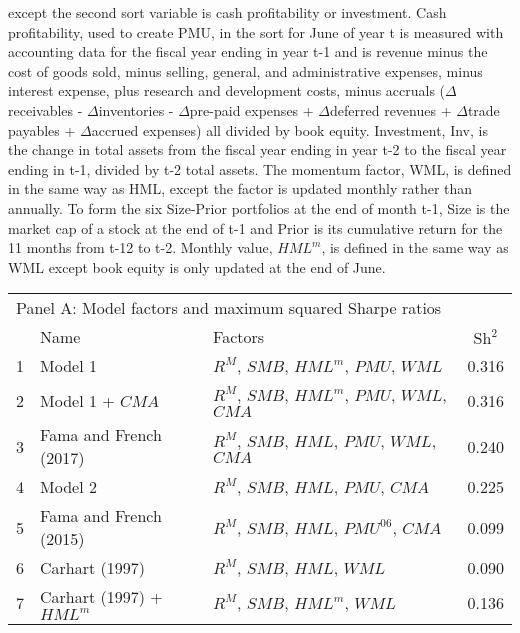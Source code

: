 \begin{table}[!ht]
{{except the second sort variable is cash profitability or investment.
Cash profitability, used to create PMU, in the sort for June of year t is
measured with accounting data for the fiscal year ending in year t-1 and is
revenue minus the cost of goods sold, minus selling, general, and
administrative expenses, minus interest expense, plus research and development
costs, minus accruals
($\Delta$receivables - $\Delta$inventories - $\Delta$pre-paid expenses +
$\Delta$deferred revenues + $\Delta$trade payables + $\Delta$accrued expenses)
all divided by book equity.
Investment, Inv, is the change in total assets from the fiscal year ending in
year t-2 to the fiscal year ending in t-1, divided by t-2 total assets.
The momentum factor, WML, is defined in the same way as HML, except the factor
is updated monthly rather than annually.
To form the six Size-Prior portfolios at the end of month t-1,
Size is the market cap of a stock at the end of t-1 and Prior is its
cumulative return for the 11 months from t-12 to t-2.
Monthly value, $HML^m$, is defined in the same way as WML except book
equity is only updated at the end of June.
}
}
\begin{tabular}{lcccccc}
  \toprule
  \multicolumn{7}{l}{Panel A: Model factors and maximum squared Sharpe ratios} \\
        & \multicolumn{2}{l}{Name}                         & \multicolumn{3}{l}{Factors}                                   & $\text{Sh}^2$   \\
  1     & \multicolumn{2}{l}{Model 1}                      & \multicolumn{3}{l}{$R^M$, $SMB$, $HML^m$, $PMU$, $WML$}        & 0.316 \\
  2     & \multicolumn{2}{l}{Model 1 + $CMA$}              & \multicolumn{3}{l}{$R^M$, $SMB$, $HML^m$, $PMU$, $WML$, $CMA$} & 0.316 \\
  3     & \multicolumn{2}{l}{Fama and French (2017)}       & \multicolumn{3}{l}{$R^M$, $SMB$, $HML$, $PMU$, $WML$, $CMA$}   & 0.240 \\
  4     & \multicolumn{2}{l}{Model 2}                      & \multicolumn{3}{l}{$R^M$, $SMB$, $HML$, $PMU$, $CMA$}          & 0.225 \\
  5     & \multicolumn{2}{l}{Fama and French (2015)}       & \multicolumn{3}{l}{$R^M$, $SMB$, $HML$, $PMU^{06}$, $CMA$}     & 0.099 \\
  6     & \multicolumn{2}{l}{Carhart (1997)}               & \multicolumn{3}{l}{$R^M$, $SMB$, $HML$, $WML$}                 & 0.090 \\
  7     & \multicolumn{2}{l}{Carhart (1997) + $HML^m$}     & \multicolumn{3}{l}{$R^M$, $SMB$, $HML^m$, $WML$}               & 0.136 \\

\end{tabular}
\end{table}
